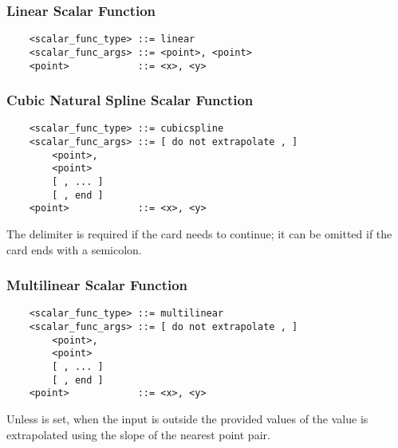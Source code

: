 \subsubsection{Linear Scalar Function}
\begin{verbatim}
    <scalar_func_type> ::= linear
    <scalar_func_args> ::= <point>, <point>
    <point>            ::= <x>, <y>
\end{verbatim}

\subsubsection{Cubic Natural Spline Scalar Function}
\begin{verbatim}
    <scalar_func_type> ::= cubicspline
    <scalar_func_args> ::= [ do not extrapolate , ]
        <point>, 
        <point>
        [ , ... ]
        [ , end ]
    <point>            ::= <x>, <y>
\end{verbatim}
The  delimiter is required if the card needs to continue;
it can be omitted if the card ends with a semicolon.

\subsubsection{Multilinear Scalar Function}
\begin{verbatim}
    <scalar_func_type> ::= multilinear
    <scalar_func_args> ::= [ do not extrapolate , ]
        <point>, 
        <point>
        [ , ... ]
        [ , end ]
    <point>            ::= <x>, <y>
\end{verbatim}
Unless  is set, when the input is outside
the provided values of  the value is extrapolated using the slope
of the nearest point pair.

